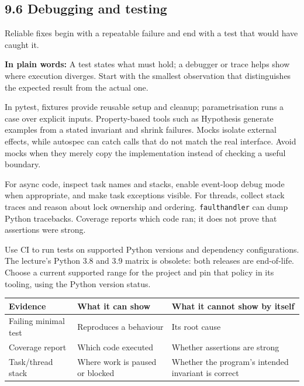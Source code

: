 \documentclass[11pt]{article}
\begin{document}
\begin{keepsection}
\section{9.6 Debugging and testing}

Reliable fixes begin with a repeatable failure and end with a test that would have caught it.

\begin{plainbox}\textbf{In plain words:} A test states what must hold; a debugger or trace helps show where execution diverges. Start with the smallest observation that distinguishes the expected result from the actual one.\end{plainbox}

In pytest, fixtures provide reusable setup and cleanup; parametrisation runs a case over explicit inputs. Property-based tools such as Hypothesis generate examples from a stated invariant and shrink failures. Mocks isolate external effects, while autospec can catch calls that do not match the real interface. Avoid mocks when they merely copy the implementation instead of checking a useful boundary.

For async code, inspect task names and stacks, enable event-loop debug mode when appropriate, and make task exceptions visible. For threads, collect stack traces and reason about lock ownership and ordering. \texttt{faulthandler} can dump Python tracebacks. Coverage reports which code ran; it does not prove that assertions were strong.

Use CI to run tests on supported Python versions and dependency configurations. The lecture’s Python 3.8 and 3.9 matrix is obsolete: both releases are end-of-life. Choose a current supported range for the project and pin that policy in its tooling, using the Python version status.

\begin{center}\small\begin{tabularx}{\linewidth}{>{\raggedright\arraybackslash}X>{\raggedright\arraybackslash}X>{\raggedright\arraybackslash}X}\toprule
\textbf{Evidence} & \textbf{What it can show} & \textbf{What it cannot show by itself} \\ \midrule
Failing minimal test & Reproduces a behaviour & Its root cause \\
Coverage report & Which code executed & Whether assertions are strong \\
Task/thread stack & Where work is paused or blocked & Whether the program’s intended invariant is correct \\
\bottomrule\end{tabularx}\end{center}


\end{keepsection}
\end{document}

